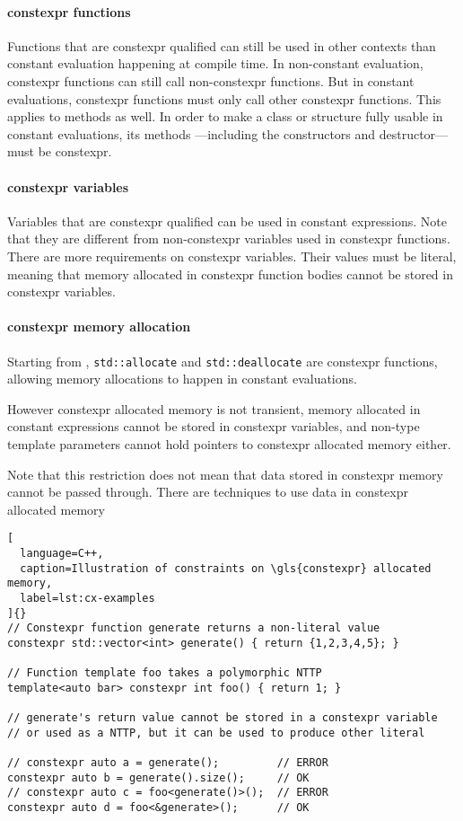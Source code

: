 \documentclass[../main]{subfiles}
\begin{document}
\paragraph{\gls{constexpr} functions} Functions that are \gls{constexpr} qualified can
still be used in other contexts than constant evaluation happening at
compile time. In non-constant evaluation, \gls{constexpr} functions can still call
non-\gls{constexpr} functions. But in constant evaluations, \gls{constexpr} functions must
only call other \gls{constexpr} functions. This applies to methods as well.
In order to make a \cpp class or structure fully usable in constant evaluations,
its methods ---including the constructors and destructor--- must be \gls{constexpr}.

\paragraph{\gls{constexpr} variables} Variables that are \gls{constexpr} qualified can be
used in constant expressions. Note that they are different from
non-\gls{constexpr} variables used in \gls{constexpr} functions.
There are more requirements on \gls{constexpr} variables.
Their values must be literal, meaning that memory allocated in \gls{constexpr}
function bodies cannot be stored in \gls{constexpr} variables.

\paragraph{
  \gls{constexpr} memory allocation
}
Starting from , \lstinline{std::allocate} and \lstinline{std::deallocate}
are \gls{constexpr} functions, allowing memory allocations to happen in
constant evaluations.

However \gls{constexpr} allocated memory is not transient, \ie memory allocated in
constant expressions cannot be stored in \gls{constexpr} variables, and non-type
template parameters cannot hold pointers to \gls{constexpr} allocated memory either.

Note that this restriction does not mean that data stored in \gls{constexpr} memory
cannot be passed through. There are techniques to use data in \gls{constexpr}
allocated memory

\begin{lstlisting}[
  language=C++,
  caption=Illustration of constraints on \gls{constexpr} allocated memory,
  label=lst:cx-examples
]{}
// Constexpr function generate returns a non-literal value
constexpr std::vector<int> generate() { return {1,2,3,4,5}; }

// Function template foo takes a polymorphic NTTP
template<auto bar> constexpr int foo() { return 1; }

// generate's return value cannot be stored in a constexpr variable
// or used as a NTTP, but it can be used to produce other literal

// constexpr auto a = generate();         // ERROR
constexpr auto b = generate().size();     // OK
// constexpr auto c = foo<generate()>();  // ERROR
constexpr auto d = foo<&generate>();      // OK
\end{lstlisting}
\end{document}
